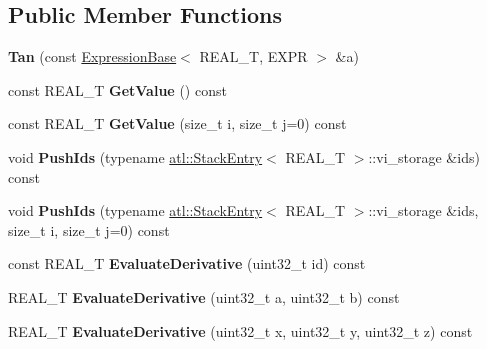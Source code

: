 \subsection*{Public Member Functions}
\begin{DoxyCompactItemize}
\item 
\hypertarget{structatl_1_1_tan_a009437f9412022ee861a1d36d743ae9d}{{\bfseries Tan} (const \hyperlink{structatl_1_1_expression_base}{Expression\+Base}$<$ R\+E\+A\+L\+\_\+\+T, E\+X\+P\+R $>$ \&a)}\label{structatl_1_1_tan_a009437f9412022ee861a1d36d743ae9d}

\item 
\hypertarget{structatl_1_1_tan_a61807403c56e8851e8c298f88b94d3be}{const R\+E\+A\+L\+\_\+\+T {\bfseries Get\+Value} () const }\label{structatl_1_1_tan_a61807403c56e8851e8c298f88b94d3be}

\item 
\hypertarget{structatl_1_1_tan_a1e1762090976901dc6e79199ed43b309}{const R\+E\+A\+L\+\_\+\+T {\bfseries Get\+Value} (size\+\_\+t i, size\+\_\+t j=0) const }\label{structatl_1_1_tan_a1e1762090976901dc6e79199ed43b309}

\item 
\hypertarget{structatl_1_1_tan_ad4ca7f38ff57eda3d9163cb2bfd6daf3}{void {\bfseries Push\+Ids} (typename \hyperlink{structatl_1_1_stack_entry}{atl\+::\+Stack\+Entry}$<$ R\+E\+A\+L\+\_\+\+T $>$\+::vi\+\_\+storage \&ids) const }\label{structatl_1_1_tan_ad4ca7f38ff57eda3d9163cb2bfd6daf3}

\item 
\hypertarget{structatl_1_1_tan_a39bf4856c2b171188160f0bf7755d6ac}{void {\bfseries Push\+Ids} (typename \hyperlink{structatl_1_1_stack_entry}{atl\+::\+Stack\+Entry}$<$ R\+E\+A\+L\+\_\+\+T $>$\+::vi\+\_\+storage \&ids, size\+\_\+t i, size\+\_\+t j=0) const }\label{structatl_1_1_tan_a39bf4856c2b171188160f0bf7755d6ac}

\item 
\hypertarget{structatl_1_1_tan_a83b6b8d04476e2dff0b23ee6ea41ff3e}{const R\+E\+A\+L\+\_\+\+T {\bfseries Evaluate\+Derivative} (uint32\+\_\+t id) const }\label{structatl_1_1_tan_a83b6b8d04476e2dff0b23ee6ea41ff3e}

\item 
\hypertarget{structatl_1_1_tan_acdc36f314d2d4164e6a7876317c9475a}{R\+E\+A\+L\+\_\+\+T {\bfseries Evaluate\+Derivative} (uint32\+\_\+t a, uint32\+\_\+t b) const }\label{structatl_1_1_tan_acdc36f314d2d4164e6a7876317c9475a}

\item 
\hypertarget{structatl_1_1_tan_a0ae8d9af53301a2dc999eddb8babe4cf}{R\+E\+A\+L\+\_\+\+T {\bfseries Evaluate\+Derivative} (uint32\+\_\+t x, uint32\+\_\+t y, uint32\+\_\+t z) const }\label{structatl_1_1_tan_a0ae8d9af53301a2dc999eddb8babe4cf}


\end{DoxyCompactItemize}
